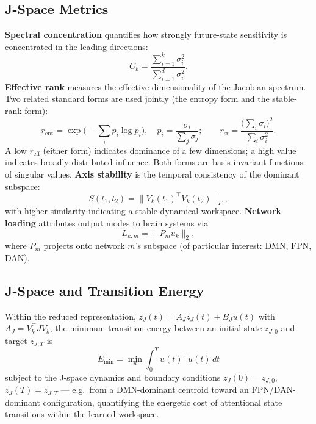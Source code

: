 \documentclass{article}
\begin{document}
\subsection{J-Space Metrics}

\textbf{Spectral concentration} quantifies how strongly future-state sensitivity is concentrated in the leading directions:
\begin{equation}
C_k=\frac{\sum_{i=1}^{k}\sigma_i^2}{\sum_{i=1}^{d}\sigma_i^2}.
\end{equation}
\textbf{Effective rank} measures the effective dimensionality of the Jacobian spectrum. Two related standard forms are used jointly (the entropy form and the stable-rank form):
\begin{equation}
r_{\mathrm{ent}}=\exp\Big(-\sum_i p_i\log p_i\Big),\quad p_i=\frac{\sigma_i}{\sum_j\sigma_j};
\qquad
r_{\mathrm{sr}}=\frac{\big(\sum_i\sigma_i\big)^2}{\sum_i\sigma_i^2}.
\end{equation}
A low $r_{\mathrm{eff}}$ (either form) indicates dominance of a few dimensions; a high value indicates broadly distributed influence. Both forms are basis-invariant functions of singular values. \textbf{Axis stability} is the temporal consistency of the dominant subspace:
\begin{equation}
S(t_1,t_2)=\big\|V_k(t_1)^{\top}V_k(t_2)\big\|_F,
\end{equation}
with higher similarity indicating a stable dynamical workspace. \textbf{Network loading} attributes output modes to brain systems via
\begin{equation}
L_{k,m}=\|P_m u_k\|_2,
\end{equation}
where $P_m$ projects onto network $m$'s subspace (of particular interest: DMN, FPN, DAN).

\subsection{J-Space and Transition Energy}

Within the reduced representation, $\dot{z}_J(t)=A_J z_J(t)+B_J u(t)$ with $A_J = V_k^\top J V_k$, the minimum transition energy between an initial state $z_{J,0}$ and target $z_{J,T}$ is
\begin{equation}
E_{\min}=\min_u \int_0^T u(t)^\top u(t)\,dt
\end{equation}
subject to the J-space dynamics and boundary conditions $z_J(0)=z_{J,0}$, $z_J(T)=z_{J,T}$ --- e.g.\ from a DMN-dominant centroid toward an FPN/DAN-dominant configuration, quantifying the energetic cost of attentional state transitions within the learned workspace.
\end{document}
